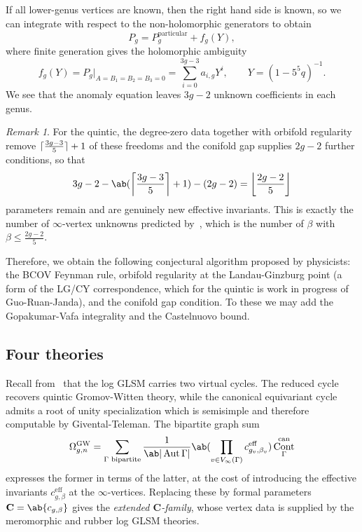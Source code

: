 \documentclass{amsart}
\theoremstyle{definition}
\theoremstyle{remark}
\newtheorem{rmk}[thm]{Remark}
\theoremstyle{plain}
\theoremstyle{definition}
\theoremstyle{remark}
\DeclarePairedDelimiter{\floor}{\lfloor}{\rfloor}
\DeclarePairedDelimiter{\ceil}{\lceil}{\rceil}
\newcommand{\mbf}[1]{\mathbf{#1}}
\newcommand{\mr}[1]{\mathrm{#1}}
\newcommand{\1}{\mathbf{1}}
\newcommand{\2}{\mathbf{2}}
\newcommand{\3}{\mathbf{3}}
\DeclareMathOperator{\Aut}{Aut}
\DeclareMathOperator{\Cont}{Cont}
\begin{document}
If all lower-genus vertices are known, then the right hand side is known, so we can integrate with respect to the non-holomorphic generators to obtain
\[ P_g = P_g^{\mr{particular}} + f_g(Y), \]
where finite generation gives the holomorphic ambiguity
\[ f_g(Y) = P_g|_{A = B_1 = B_2 = B_3 = 0} = \sum_{i=0}^{3g-3}a_{i,g}Y^i, \qquad Y = (1-5^5q)^{-1}. \]
We see that the anomaly equation leaves \(3g-2\) unknown coefficients in each genus.

\begin{rmk}
    For the quintic, the degree-zero data together with orbifold regularity remove \(\ceil{\frac{3g-3}{5}}+1\) of these freedoms and the conifold gap supplies \(2g-2\) further conditions, so that
    \[ 3g-2 - \ab(\ceil*{\frac{3g-3}{5}}+1) - (2g-2) = \floor*{\frac{2g-2}{5}} \]
    parameters remain and are genuinely new effective invariants. This is exactly the number of \(\infty\)-vertex unknowns predicted by~, which is the number of \(\beta\) with \(\beta \leq \frac{2g-2}{5}\).
\end{rmk}

Therefore, we obtain the following conjectural algorithm proposed by physicists: the BCOV Feynman rule, orbifold regularity at the Landau-Ginzburg point (a form of the LG/CY correspondence, which for the quintic is work in progress of Guo-Ruan-Janda), and the conifold gap condition. To these we may add the Gopakumar-Vafa integrality and the Castelnuovo bound.

\subsection{Four theories}%
\label{sub:Four theories}

Recall from~ that the log GLSM carries two virtual cycles. The reduced cycle recovers quintic Gromov-Witten theory, while the canonical equivariant cycle admits a root of unity specialization which is semisimple and therefore computable by Givental-Teleman. The bipartite graph sum
\[ \Omega^{\mr{GW}}_{g,n} = \sum_{\Gamma \text{ bipartite}} \frac{1}{\ab|\Aut \Gamma|} \ab( \prod_{v \in V_{\infty}(\Gamma)} c^{\mr{eff}}_{g_v,\beta_v}) \Cont^{\mr{can}}_{\Gamma} \]
expresses the former in terms of the latter, at the cost of introducing the effective invariants \(c^{\mr{eff}}_{g,\beta}\) at the \(\infty\)-vertices. Replacing these by formal parameters \(\mbf{C} = \ab\{c_{g,\beta}\}\) gives the \textit{extended \(\mbf{C}\)-family}, whose vertex data is supplied by the meromorphic and rubber log GLSM theories.
\end{document}
